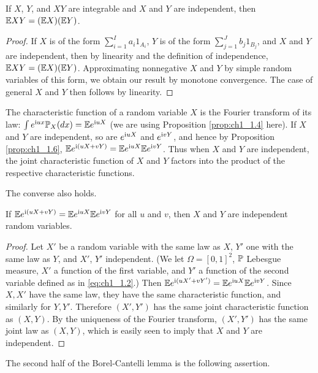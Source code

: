 \begin{proposition}\label{prop:ch1_1.6}
If $X$, $Y$, and $XY$ are integrable and $X$ and $Y$ are independent, then $\E XY = (\E X)(\E Y)$.
\end{proposition}

\begin{proof}
If $X$ is of the form $\sum_{i=1}^I a_i1_{A_i}$, $Y$ is of the form $\sum_{j=1}^J b_j1_{B_j}$, and $X$ and $Y$ are independent, then by linearity and the definition of independence, $\E XY = (\E X)(\E Y)$. Approximating nonnegative $X$ and $Y$ by simple random variables of this form, we obtain our result by monotone convergence. The case of general $X$ and $Y$ then follows by linearity.
\end{proof}

The characteristic function of a random variable $X$ is the Fourier transform of its law: $\int e^{\im ux}\P_X(dx) = \E e^{\im uX}$ (we are using Proposition \ref{prop:ch1_1.4} here). If $X$ and $Y$ are independent, so are $e^{\im uX}$ and $e^{\im vY}$, and hence by Proposition \ref{prop:ch1_1.6}, $\E e^{\im(uX+vY)} = \E e^{\im uX}\E e^{\im vY}$. Thus when $X$ and $Y$ are independent, the joint characteristic function of $X$ and $Y$ factors into the product of the respective characteristic functions.

The converse also holds.

\begin{proposition}\label{prop:ch1_1.7}
If $\E e^{\im(uX+vY)} = \E e^{\im uX}\E e^{\im vY}$ for all $u$ and $v$, then $X$ and $Y$ are independent random variables.
\end{proposition}

\begin{proof}
Let $X'$ be a random variable with the same law as $X$, $Y'$ one with the same law as $Y$, and $X'$, $Y'$ independent. (We let $\Omega = [0,1]^2$, $\P$ Lebesgue measure, $X'$ a function of the first variable, and $Y'$ a function of the second variable defined as in \eqref{eq:ch1_1.2}.) Then $\E e^{\im(uX'+vY')} = \E e^{\im uX}\E e^{\im vY}$. Since $X,X'$ have the same law, they have the same characteristic function, and similarly for $Y,Y'$. Therefore $(X',Y')$ has the same joint characteristic function as $(X,Y)$. By the uniqueness of the Fourier transform, $(X',Y')$ has the same joint law as $(X,Y)$, which is easily seen to imply that $X$ and $Y$ are independent.
\end{proof}

The second half of the Borel-Cantelli lemma is the following assertion.

